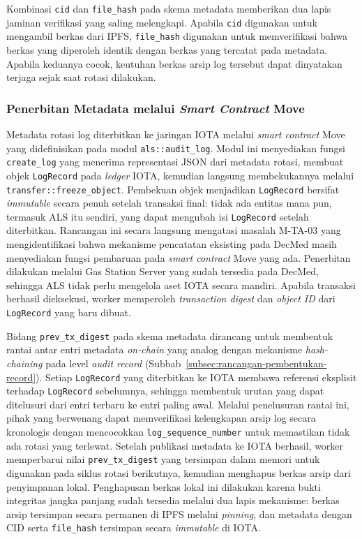Kombinasi \texttt{cid} dan \texttt{file\_hash} pada skema metadata memberikan dua lapis jaminan verifikasi yang saling melengkapi. Apabila \texttt{cid} digunakan untuk mengambil berkas dari IPFS, \texttt{file\_hash} digunakan untuk memverifikasi bahwa berkas yang diperoleh identik dengan berkas yang tercatat pada metadata. Apabila keduanya cocok, keutuhan berkas arsip log tersebut dapat dinyatakan terjaga sejak saat rotasi dilakukan.

\subsubsection{Penerbitan Metadata melalui \textit{Smart Contract} Move}
\label{subsubsec:rancangan-sc-move}

Metadata rotasi log diterbitkan ke jaringan IOTA melalui \textit{smart contract} Move yang didefinisikan pada modul \texttt{als::audit\_log}. Modul ini menyediakan fungsi \texttt{create\_log} yang menerima representasi JSON dari metadata rotasi, membuat objek \texttt{LogRecord} pada \textit{ledger} IOTA, kemudian langsung membekukannya melalui \texttt{transfer::freeze\_object}. Pembekuan objek menjadikan \texttt{LogRecord} bersifat \textit{immutable} secara penuh setelah transaksi final: tidak ada entitas mana pun, termasuk ALS itu sendiri, yang dapat mengubah isi \texttt{LogRecord} setelah diterbitkan. Rancangan ini secara langsung mengatasi masalah M-TA-03 yang mengidentifikasi bahwa mekanisme pencatatan eksisting pada DecMed masih menyediakan fungsi pembaruan pada \textit{smart contract} Move yang ada. Penerbitan dilakukan melalui Gas Station Server yang sudah tersedia pada DecMed, sehingga ALS tidak perlu mengelola aset IOTA secara mandiri. Apabila transaksi berhasil dieksekusi, worker memperoleh \textit{transaction digest} dan \textit{object ID} dari \texttt{LogRecord} yang baru dibuat.

Bidang \texttt{prev\_tx\_digest} pada skema metadata dirancang untuk membentuk rantai antar entri metadata \textit{on-chain} yang analog dengan mekanisme \textit{hash-chaining} pada level \textit{audit record} (Subbab~\ref{subsec:rancangan-pembentukan-record}). Setiap \texttt{LogRecord} yang diterbitkan ke IOTA membawa referensi eksplisit terhadap \texttt{LogRecord} sebelumnya, sehingga membentuk urutan yang dapat ditelusuri dari entri terbaru ke entri paling awal. Melalui penelusuran rantai ini, pihak yang berwenang dapat memverifikasi kelengkapan arsip log secara kronologis dengan mencocokkan \texttt{log\_sequence\_number} untuk memastikan tidak ada rotasi yang terlewat. Setelah publikasi metadata ke IOTA berhasil, worker memperbarui nilai \texttt{prev\_tx\_digest} yang tersimpan dalam memori untuk digunakan pada siklus rotasi berikutnya, kemudian menghapus berkas arsip dari penyimpanan lokal. Penghapusan berkas lokal ini dilakukan karena bukti integritas jangka panjang sudah tersedia melalui dua lapis mekanisme: berkas arsip tersimpan secara permanen di IPFS melalui \textit{pinning}, dan metadata dengan CID serta \texttt{file\_hash} tersimpan secara \textit{immutable} di IOTA.

